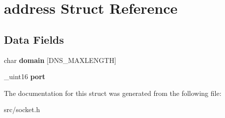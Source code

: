 \hypertarget{structaddress}{
\section{address Struct Reference}
\label{structaddress}
}
\subsection*{Data Fields}
\begin{DoxyCompactItemize}
\item 
\hypertarget{structaddress_af846ef3ccd42b488028a701998872717}{
char {\bfseries domain} \mbox{[}DNS\_\-MAXLENGTH\mbox{]}}
\label{structaddress_af846ef3ccd42b488028a701998872717}

\item 
\hypertarget{structaddress_a722f828c1e6c066c3f6b33a43ba1301a}{
\_\-uint16 {\bfseries port}}
\label{structaddress_a722f828c1e6c066c3f6b33a43ba1301a}

\end{DoxyCompactItemize}


The documentation for this struct was generated from the following file:\begin{DoxyCompactItemize}
\item 
src/socket.h\end{DoxyCompactItemize}
